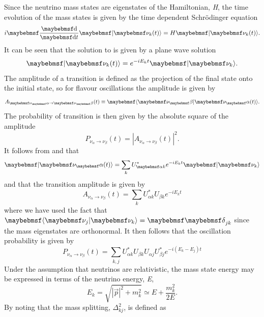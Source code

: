 Since the neutrino mass states are eigenstates of the Hamiltonian, \textit{H}, the time evolution of the mass states is given by the time dependent Schr{\"o}dinger equation
\begin{equation} \label{eqn:t.d. schrodinger}
    i \dByd{}{t}\ket{\nu_{k}(t)} = H \ket{\nu_{k}(t)}.
\end{equation}
It can be seen that the solution to  is given by a plane wave solution 
\begin{equation}\label{eqn:plane wave soln}
    \ket{\nu_{k}(t)} = e^{-iE_{k}t} \ket{\nu_{k}}.
\end{equation}
The amplitude of a transition is defined as the projection of the final state onto the initial state, so for flavour oscillations the amplitude is given by
\begin{equation}
    A_{\nu_\alpha \rightarrow \nu_\beta}(t) \isdefinedas \braket{\nu_\beta|\nu_\alpha(t)}.
\end{equation}
The probability of transition is then given by the absolute square of the amplitude
\begin{equation}
    P_{\nu_\alpha \rightarrow \nu_\beta}(t) = |A_{\nu_\alpha \rightarrow \nu_\beta}(t)|^2.
\end{equation}
It follows from  and  that
\begin{equation}
    \ket{\nu_\alpha(t)} = \sum_k U^*_{\alpha k} e^{-iE_kt}\ket{\nu_k}
\end{equation}
and that the transition amplitude is given by
\begin{equation}
    A_{\nu_\alpha \rightarrow \nu_\beta}(t) = \sum_k U^*_{\alpha k} U_{\beta k} e^{-iE_kt}
\end{equation}
where we have used the fact that $\braket{\nu_j|\nu_k} = \Kronecker_{jk}$ since the mass eigenstates are orthonormal. It then follows that the oscillation probability is given by
\begin{equation}
    P_{\nu_\alpha \rightarrow \nu_\beta}(t) = \sum_{k,j} U^*_{\alpha k} U_{\beta k} U_{\alpha j} U^*_{\beta j} e^{-i(E_k-E_j)t}
\end{equation}
Under the assumption that neutrinos are relativistic, the mass state energy may be expressed in terms of the neutrino energy, \textit{E},
\begin{equation}
    E_k = \sqrt{|\Vec{p}|^2 + m_k^2} \simeq E + \frac{m_k^2}{2E}.
\end{equation}
By noting that the mass splitting, $\Delta^2_{kj}$, is defined as 
